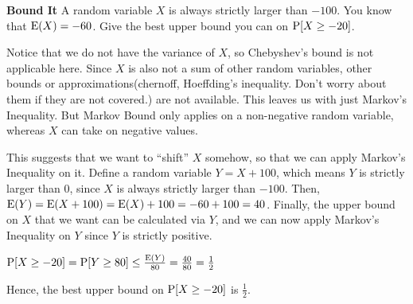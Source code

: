 \question \textbf{Bound It}\newline
A random variable $X$ is always strictly larger than $-100$. You know 
that $\E(X) = -60$. Give the best upper bound you can on $\P[X \geq -20]$.
\begin{solution}[3cm]
Notice that we do not have the variance of $X$, so Chebyshev's bound 
is not applicable here. 
Since $X$ is also not a sum of other random variables, other bounds or 
approximations(chernoff, Hoeffding's inequality. Don't worry about them if they are not covered.) are not available. This leaves us with just Markov's 
Inequality. But Markov Bound only applies on a non-negative random 
variable, whereas $X$ can take on negative values.

					
This suggests that we want to “shift” $X$ somehow, so that we can apply 
Markov’s Inequality on it. Define a random variable $Y = X + 100$, 
which means $Y$ is strictly larger than 0, since $X$ is always strictly 
larger than $-100$. Then, $\E(Y) = \E(X +100) = \E(X)+100 = -60+100 = 40$. 
Finally, the upper bound on $X$ that we want can be calculated via $Y$, 
and we can now apply Markov's Inequality on $Y$ since $Y$ is strictly 
positive.
					
$\P[X \geq -20] = \P[Y \geq 80] \leq \frac{\E(Y)}{80} = \frac{40}{80} = 
\frac{1}{2}$
					
Hence, the best upper bound on $\P[X \geq -20]$ is $\frac{1}{2}$. 
\end{solution}